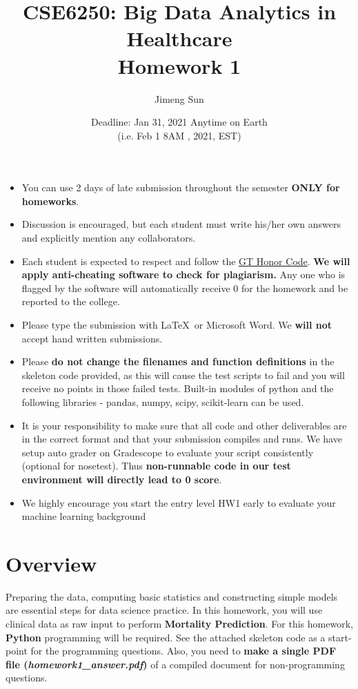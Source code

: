 \documentclass[12pt]{article}
\title{CSE6250: Big Data Analytics in Healthcare \\ Homework 1}
\author{Jimeng Sun}
\date{Deadline: Jan 31, 2021 Anytime on Earth\\ (i.e. Feb 1 8AM , 2021, EST)}
\begin{document}
\maketitle
\begin{itemize}
\item You can use 2 days of late submission throughout the semester \textbf{ONLY for homeworks}.
\item Discussion is encouraged, but each student must write his/her own answers and explicitly mention any collaborators.
\item Each student is expected to respect and follow the \href{http://www.honor.gatech.edu/}{ GT Honor Code}. \textbf{We will apply anti-cheating software to check for plagiarism.} Any one who is flagged by the software will automatically receive 0 for the homework and be reported to the college.
\item Please type the submission with \LaTeX\ or Microsoft Word. We \textbf{will not} accept hand written submissions.
\item Please \textbf{do not change the filenames and function definitions} in the skeleton code provided, as this will cause the test scripts to fail and you will  receive no points in those failed tests. Built-in modules of python and the following libraries -  pandas, numpy, scipy, scikit-learn can be used. 
\item It is your responsibility to make sure that all code and other deliverables are in the correct format and that your submission compiles and runs. We have setup auto grader on Gradescope to evaluate your script consistently (optional for nosetest). Thus \textbf{non-runnable code in our test environment will directly lead to 0 score}.
\item We highly encourage you start the entry level HW1 early to evaluate your machine learning background 
\end{itemize}

\section*{Overview}

Preparing the data, computing basic statistics and constructing simple models are essential steps for  data science practice. In this homework, you will use clinical data as raw input to perform \textbf{Mortality Prediction}. For this homework, \textbf{Python} programming will be required. See the attached skeleton code as a start-point for the programming questions. Also, you need to \textbf{make a single PDF file (\textit{homework1\_answer.pdf}) }of a compiled document for non-programming questions.
\end{document}
